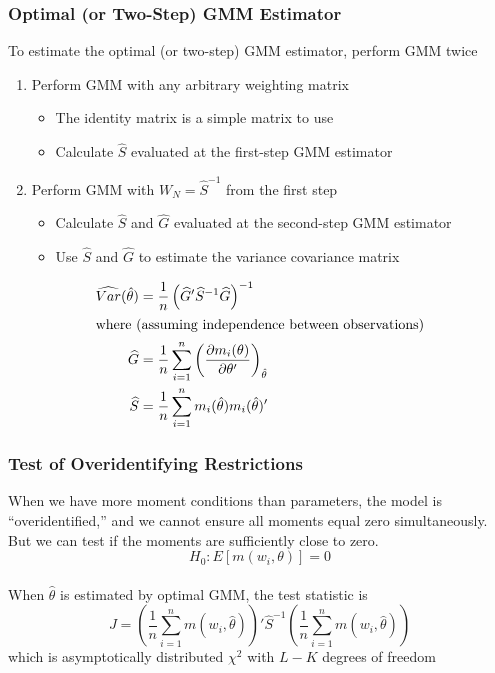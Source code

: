 \documentclass{beamer}
\begin{document}
\begin{frame}\frametitle{Optimal (or Two-Step) GMM Estimator}
    To estimate the optimal (or two-step) GMM estimator, perform GMM twice
    \begin{enumerate}
    	\item Perform GMM with any arbitrary weighting matrix
    	\begin{itemize}
    		\item The identity matrix is a simple matrix to use
    		\item Calculate $\widehat{S}$ evaluated at the first-step GMM estimator
    	\end{itemize}
    	\item Perform GMM with $W_N = \widehat{S}^{-1}$ from the first step
    	\begin{itemize}
    		\item Calculate $\widehat{S}$ and $\widehat{G}$ evaluated at the second-step GMM estimator
    		\item Use $\widehat{S}$ and $\widehat{G}$ to estimate the variance covariance matrix
    	\end{itemize}
    \end{enumerate}
    \vspace{2ex}
    \begin{align*}
    	\widehat{Var}(\hat{\theta}) &= \frac{1}{n} \left( \widehat{G}' \widehat{S}^{-1} \widehat{G} \right)^{-1} \\
    	\intertext{where (assuming independence between observations)}
    	\widehat{G} &= \frac{1}{n} \sum_{i =1 }^n \left( \frac{\partial m_i(\theta)}{\partial \theta'} \right)_{\hat{\theta}} \\
    	\widehat{S} &= \frac{1}{n} \sum_{i = 1}^n m_i(\hat{\theta}) m_i(\hat{\theta})'
    \end{align*}
\end{frame}

\begin{frame}\frametitle{Test of Overidentifying Restrictions}
    When we have more moment conditions than parameters, the model is ``overidentified,'' and we cannot ensure all moments equal zero simultaneously. But we can test if the moments are sufficiently close to zero.
    $$H_0: E[m(w_i, \theta)] = 0$$ \\
    \vspace{3ex}
    When $\hat{\theta}$ is estimated by optimal GMM, the test statistic is
    $$J = \left( \frac{1}{n} \sum_{i = 1}^n m(w_i, \hat{\theta}) \right)' \widehat{S}^{-1} \left( \frac{1}{n} \sum_{i = 1}^n m(w_i, \hat{\theta}) \right)$$
    which is asymptotically distributed $\chi^2$ with $L - K$ degrees of freedom
\end{frame}
\end{document}
